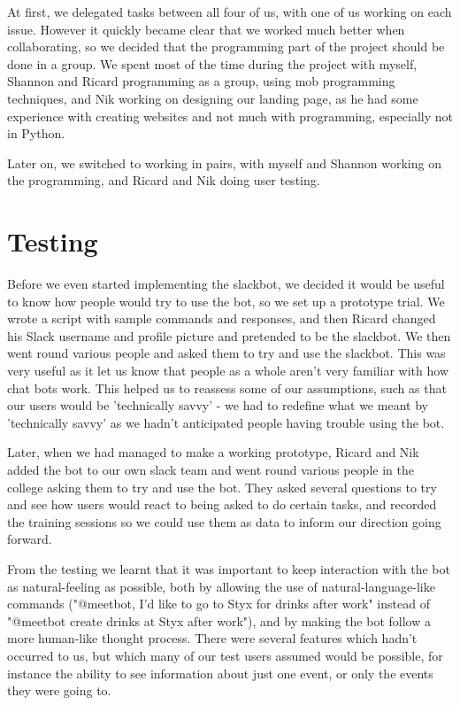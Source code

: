 \documentclass{report}
\begin{document}
At first, we delegated tasks between all four of us, with one of us working on each issue. However it quickly became clear that we worked much better when collaborating, so we decided that the programming part of the project should be done in a group. We spent most of the time during the project with myself, Shannon and Ricard programming as a group, using mob programming techniques, and Nik working on designing our landing page, as he had some experience with creating websites and not much with programming, especially not in Python.

Later on, we switched to working in pairs, with myself and Shannon working on the programming, and Ricard and Nik doing user testing.

\section{Testing}
Before we even started implementing the slackbot, we decided it would be useful to know how people would try to use the bot, so we set up a prototype trial. We wrote a script with sample commands and responses, and then Ricard changed his Slack username and profile picture and pretended to be the slackbot. We then went round various people and asked them to try and use the slackbot. This was very useful as it let us know that people as a whole aren't very familiar with how chat bots work. This helped us to reassess some of our assumptions, such as that our users would be 'technically savvy' - we had to redefine what we meant by 'technically savvy' as we hadn't anticipated people having trouble using the bot.

Later, when we had managed to make a working prototype, Ricard and Nik added the bot to our own slack team and went round various people in the college asking them to try and use the bot. They asked several questions to try and see how users would react to being asked to do certain tasks, and recorded the training sessions so we could use them as data to inform our direction going forward.

From the testing we learnt that it was important to keep interaction with the bot as natural-feeling as possible, both by allowing the use of natural-language-like commands ("@meetbot, I'd like to go to Styx for drinks after work" instead of "@meetbot create drinks at Styx after work"), and by making the bot follow a more human-like thought process. There were several features which hadn't occurred to us, but which many of our test users assumed would be possible, for instance the ability to see information about just one event, or only the events they were going to.
\end{document}
